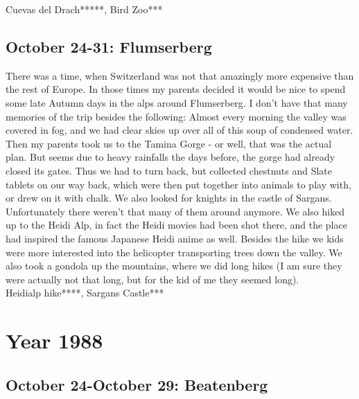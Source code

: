 Cuevas del Drach*****, Bird Zoo***

\section{October 24-31: Flumserberg}
\label{1987:Flums}

There was a time, when Switzerland was not that amazingly more expensive than the rest of Europe. In those times my parents decided it would be nice to spend some late Autumn days in the alps around Flumserberg. I don't have that many memories of the trip besides the following: Almost every morning the valley was covered in fog, and we had clear skies up over all of this soup of condensed water. Then my parents took us to the Tamina Gorge - or well, that was the actual plan. But seems due to heavy rainfalls the days before, the gorge had already closed its gates. Thus we had to turn back, but collected chestnuts and Slate tablets on our way back, which were then put together into animals to play with, or drew on it with chalk. We also looked for knights in the castle of Sargans. Unfortunately there weren't that many of them around anymore. We also hiked up to the Heidi Alp, in fact the Heidi movies had been shot there, and the place had inspired the famous Japanese Heidi anime as well. Besides the hike we kids were more interested into the helicopter transporting trees down the valley. We also took a gondola up the mountains, where we did long hikes (I am sure they were actually not that long, but for the kid of me they seemed long). \\

Heidialp hike****, Sargans Castle***

\chapter{Year 1988}
\label{1988}


\section{October 24-October 29: Beatenberg}
\label{1988:Beatenberg}

